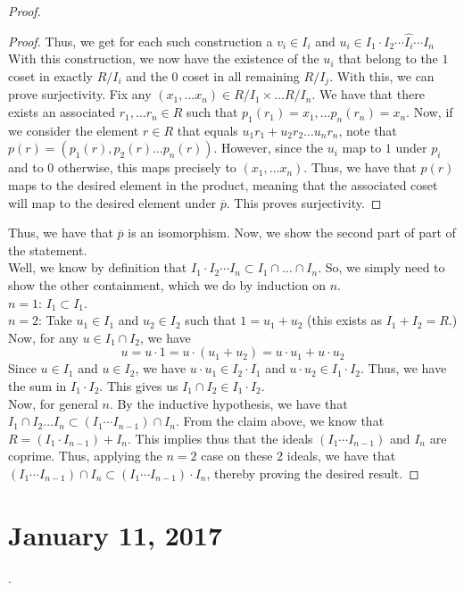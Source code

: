 \documentclass{amsart}
\theoremstyle{definition}
\theoremstyle{remark}
\begin{document}
\begin{proof}
\begin{proof}
        Thus, we get for each such construction a $v_i \in I_i$ and $u_i \in I_1 \cdot I_2 \cdots \widehat{I_i} \cdots I_n$
        With this construction, we now have the existence of the $u_i$ that belong
        to the $1$ coset in exactly $R/I_i$ and the $0$ coset in all remaining $R/I_j$.
        With this, we can prove surjectivity.
        Fix any $(x_1, \dots x_n) \in R/I_1 \times \dots R/I_n$. We have that there exists
        an associated $r_1, \dots r_n \in R$ such that $p_1(r_1) = x_1, \dots p_n(r_n) = x_n$.
        Now, if we consider the element $r \in R$ that equals $u_1r_1 + u_2r_2 \dots u_nr_n$,
        note that $p(r) = (p_1(r), p_2(r) \dots p_n(r))$. However, since the $u_i$ map to $1$ under
        $p_i$ and to $0$ otherwise, this maps precisely to $(x_1, \dots x_n)$. Thus, we have
 that $p(r)$ maps to the desired element in the product, meaning that the
        associated coset will map to the desired element under $\overline{p}$. This proves
        surjectivity.
    \end{proof}
    Thus, we have that $\overline{p}$ is an isomorphism. Now, we show the second part of
    part of the statement. \\
    Well, we know by definition that $I_1 \cdot I_2 \cdots I_n \subset I_1 \cap \dots \cap I_n$. So,
    we simply need to show the other containment, which we do by induction on $n$. \\
    $n = 1$: $I_1 \subset I_1$. \\
    $n = 2$: Take $u_1 \in I_1$ and $u_2 \in I_2$ such that $1 = u_1 + u_2$ (this exists as $I_1 + I_2 = R$.)
    Now, for any $u \in I_1 \cap I_2$, we have
    $$
    u = u \cdot 1 = u \cdot (u_1 + u_2) = u \cdot u_1 + u \cdot u_2
    $$
    Since $u \in I_1$ and $u \in I_2$, we have $u \cdot u_1 \in I_2 \cdot I_1$ and
    $u \cdot u_2 \in I_1 \cdot I_2$. Thus, we have the sum in $I_1 \cdot I_2$. This gives us
    $I_1 \cap I_2 \in I_1 \cdot I_2$. \\
    Now, for general $n$. By the inductive hypothesis, we have that
    $I_1 \cap I_2 \dots I_n \subset (I_1 \cdots I_{n-1}) \cap I_n$. From the claim above,
    we know that $R = (I_1 \cdot I_{n-1}) + I_n$. This implies thus that the ideals
    $(I_1 \cdots I_{n-1})$ and $I_n$ are coprime. Thus, applying the $n = 2$ case on these
    2 ideals, we have that $(I_1 \cdots I_{n-1}) \cap I_n \subset (I_1 \cdots I_{n-1}) \cdot I_n$,
    thereby proving the desired result. 
\end{proof}

\section{January 11, 2017}
\rmk .
\end{document}
